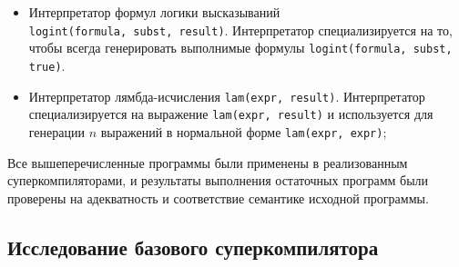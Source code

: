 \begin{itemize}
 \item Интерпретатор формул логики высказываний \\ \lstinline{logint(formula, subst, result)}.
       Интерпретатор специализируется на то, чтобы всегда генерировать выполнимые формулы
       \lstinline{logint(formula, subst, true)}.
 \item Интерпретатор лямбда-исчисления \lstinline{lam(expr, result)}.
       Интерпретатор специализируется на выражение \lstinline{lam(expr, result)}
       и используется для генерации $n$ выражений в нормальной форме \lstinline{lam(expr, expr)};
\end{itemize}

Все вышеперечисленные программы были применены в реализованным суперкомпиляторами, и результаты
выполнения остаточных программ были проверены на адекватность и соответствие семантике исходной программы.

\subsection{Исследование базового суперкомпилятора \ukanren}


